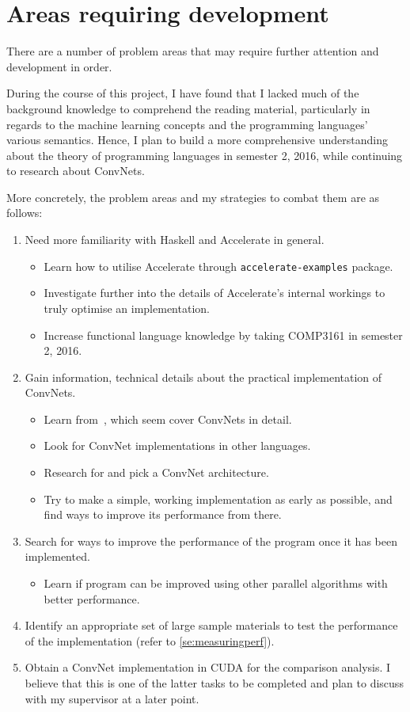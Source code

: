 \section{Areas requiring development} \label{se:probareas}

There are a number of problem areas that may require further attention and development in order. 

During the course of this project, I have found that I lacked much of the background knowledge to comprehend the reading material, particularly in regards to the machine learning concepts and the programming languages' various semantics. Hence, I plan to build a more comprehensive understanding about the theory of programming languages in semester 2, 2016, while continuing to research about ConvNets. 

More concretely, the problem areas and my strategies to combat them are as follows:
\begin{enumerate}
\item Need more familiarity with Haskell and Accelerate in general.
  \begin{itemize}
  \item Learn how to utilise Accelerate through \texttt{accelerate-examples} package.
  \item Investigate further into the details of Accelerate's internal workings to truly optimise an implementation.
  \item Increase functional language knowledge by taking COMP3161 in semester 2, 2016.
  \end{itemize}
\item Gain information, technical details about the practical implementation of ConvNets.
  \begin{itemize}
  \item Learn from~\cite{Kar16, Goo16}, which seem cover ConvNets in detail.
  \item Look for ConvNet implementations in other languages.
  \item Research for and pick a ConvNet architecture.
  \item Try to make a simple, working implementation as early as possible, and find ways to improve its performance from there.
  \end{itemize}
\item Search for ways to improve the performance of the program once it has been implemented.
  \begin{itemize}
  \item Learn if program can be improved using other parallel algorithms with better performance.
  \end{itemize}
\item Identify an appropriate set of large sample materials to test the performance of the implementation (refer to \ref{se:measuringperf}).
\item Obtain a ConvNet implementation in CUDA for the comparison analysis. I believe that this is one of the latter tasks to be completed and plan to discuss with my supervisor at a later point.
\end{enumerate}

